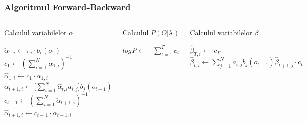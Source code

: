 \begin{frame}[fragile]
  \frametitle{Algoritmul Forward-Backward} \vspace*{-1em}
  \begin{columns}[T]
    \begin{algorithm}[H]
      \scriptsize
      \caption{Calculul variabilelor $\alpha$}
      \label{alg1}
       
      \begin{algorithmic}[2]
         \STATE $\ddot{\alpha}_{1,i} \leftarrow
        \pi_i \cdot b_i(o_1)$
        \ENDFOR
        \STATE $c_1 \leftarrow (\displaystyle\sum_{i=1}^{N}
        \ddot{\alpha}_{1,i})^{-1}$  \STATE
        $\hat{\alpha}_{1,i} \leftarrow c_1 \cdot \ddot{\alpha}_{1,i}$
        \ENDFOR
          \STATE
        $\ddot{\alpha}_{t+1,i} \leftarrow \Big[
        \displaystyle\sum_{i=1}^{N}\hat{\alpha}_{t,i}a_{i,j}\Big]
        b_{j}(o_{t+1})$
        \ENDFOR
        \STATE $c_{t+1} \leftarrow (\displaystyle\sum_{i=1}^{N}
        \ddot{\alpha}_{t+1,i})^{-1}$  \STATE
        $\hat{\alpha}_{t+1,i} \leftarrow c_{t+1} \cdot
        \ddot{\alpha}_{t+1,i}$
        \ENDFOR
        \ENDFOR
      \end{algorithmic}
    \end{algorithm}
    \begin{algorithm}[H]
      \scriptsize
      \caption{Calculul $P(O \vert \lambda)$}
      \label{alg2}
       
      \begin{algorithmic}[2]
        \STATE $logP \leftarrow -\displaystyle\sum_{t=1}^{T}c_t$
      \end{algorithmic}
    \end{algorithm}
    \vspace*{1em}
    \begin{algorithm}[H]
      \scriptsize
      \caption{Calculul variabilelor $\beta$}
      \label{alg3}
       
      \begin{algorithmic}[2]
         \STATE $\hat{\beta}_{T,i} \leftarrow \cdot
        c_T$
        \ENDFOR
          \STATE
        $\hat{\beta}_{t,i} \leftarrow \displaystyle\sum_{j=1}^{N}
        a_{i,j} b_{j}(o_{t+1}) \hat{\beta}_{t+1,j} \cdot c_t$
        \ENDFOR
        \ENDFOR
      \end{algorithmic}
    \end{algorithm}
  \end{columns}
\end{frame}

